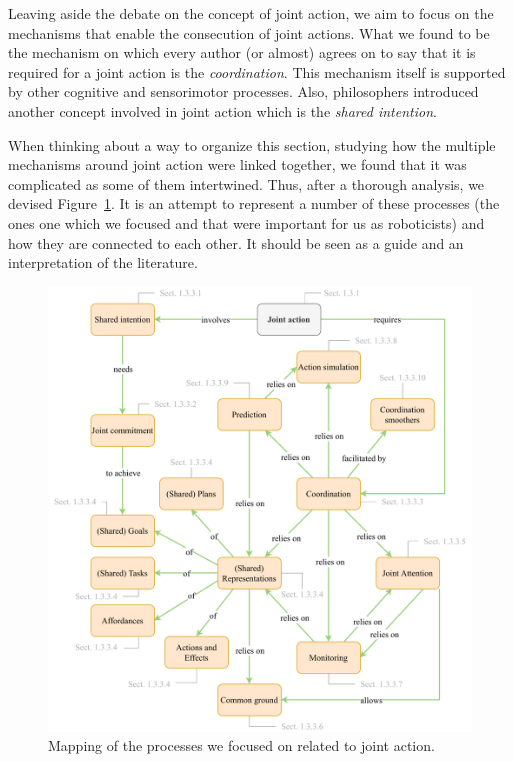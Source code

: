 \documentclass[a4paper,11pt,twoside]{StyleThese}
\begin{document}
Leaving aside the debate on the concept of joint action, we aim to focus on the mechanisms that enable the consecution of joint actions. What we found to be the mechanism on which every author (or almost) agrees on to say that it is required for a joint action is the \emph{coordination}. This mechanism itself is supported by other cognitive and sensorimotor processes. Also, philosophers introduced another concept involved in joint action which is the \emph{shared intention}. 

When thinking about a way to organize this section, studying how the multiple mechanisms around joint action were linked together, we found that it was complicated as some of them intertwined. Thus, after a thorough analysis, we devised Figure~\ref{chap1:fig:ja}. It is an attempt to represent a number of these processes (the ones one which we focused and that were important for us as roboticists) and how they are connected to each other. It should be seen as a guide and an interpretation of the literature.

\begin{figure}[!htb]
	\includegraphics[width=\linewidth]{figures/chapter1/joint_action.pdf}
	\caption{Mapping of the processes we focused on related to joint action.}
	\label{chap1:fig:ja}
\end{figure}
\end{document}
